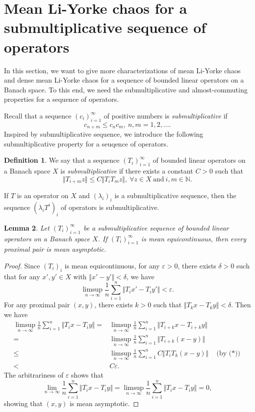 \documentclass[12pt,a4paper]{amsart}
\theoremstyle{definition}
\newtheorem{defn}{Definition}[section]
\theoremstyle{plain}
\newtheorem{lem}[defn]{Lemma}
\begin{document}
\section{Mean Li-Yorke chaos for a submultiplicative sequence of operators}\label{sec:LYsub}

In this section, we want to give more characterizations of  mean Li-Yorke chaos and dense mean Li-Yorke chaos for a sequence
of bounded linear operators on a Banach space.
To this end, we need the submultiplicative and almost-commuting properties for a sequence of operators.

Recall that a sequence $(c_i)_{i=1}^{\infty}$ of positive numbers is \emph{submultiplicative} if
\[
    c_{n+m}\leq c_n c_m,\ n,m=1,2,\dotsc.
\]
Inspired by submultiplicative sequence, we introduce the following submultiplicative property for a seuqence of operators.

\begin{defn}
    We say that a sequence $(T_i)_{i=1}^\infty$ of bounded linear operators on a Banach space $X$ is \emph{submultiplicative} if
    there exists a constant $C>0$ such that
    \[
        \Vert T_{i+m}z\Vert \leq C\Vert T_i T_m z \Vert,\
        \forall z\in X \ \text{and} \ i,m\in\mathbb{N}. \tag{$*$}
    \]
\end{defn}
If $T$ is an operator on $X$ and $(\lambda_i)_i$ is a submultiplicative sequence, then the sequence $(\lambda_i T^i)_i$ of operators is submultiplicative.

\begin{lem}\label{lem:mprox-masym}
    Let $(T_i)_{i=1}^\infty$ be a submultiplicative sequence of bounded linear operators on a Banach space $X$.
    If $(T_i)_{i=1}^\infty$ is mean equicontinuous, then every proximal pair is mean asymptotic.
\end{lem}
\begin{proof}
    Since $(T_i)_{i}$ is mean equicontinuous, for any $\varepsilon>0$, there exists $\delta>0$ such that for any $x',y'\in X$ with $\Vert x'-y'\Vert<\delta$, we have
    \[
        \limsup_{n\to\infty}\frac{1}{n}\sum_{i=1}^{n}\Vert T_ix'-T_iy'\Vert<\varepsilon.
    \]
    For any proximal pair $(x,y)$,  there exists $k>0$ such that $\Vert T_kx-T_ky\Vert<\delta$. Then we have
    \begin{align*}
        \limsup_{n\to\infty}\frac{1}{n}\sum_{i=1}^n\Vert T_ix-T_iy\Vert
        =    & \limsup_{n\to\infty}\frac{1}{n}\sum_{i=1}^n\Vert T_{i+k}x-T_{i+k}y\Vert  \\
        =    & \limsup_{n\to\infty}\frac{1}{n}\sum_{i=1}^n\Vert T_{i+k}(x-y)\Vert \\
        \leq & \limsup_{n\to\infty}\frac{1}{n}\sum_{i=1}^nC\Vert T_{i}T_k(x-y)\Vert\quad\text{(by ($*$))} \\
        <    & C\varepsilon.
    \end{align*}
    The arbitrariness of $\varepsilon$ shows that
    \[
        \lim_{n\to\infty}\frac{1}{n}\sum_{i=1}^n\Vert T_ix-T_iy\Vert=\limsup_{n\to\infty}\frac{1}{n}\sum_{i=1}^n\Vert T_ix-T_iy\Vert=0,
    \]
    showing that $(x,y)$ is mean asymptotic.
\end{proof}
\end{document}
